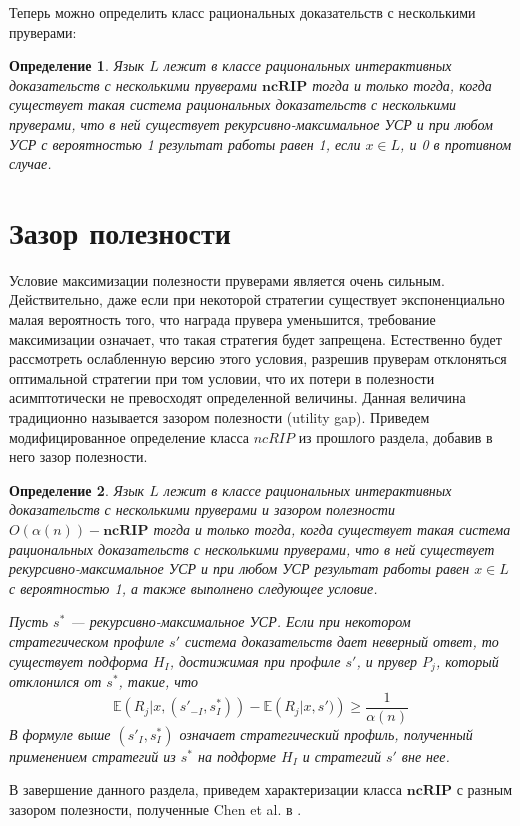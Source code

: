 \documentclass[14pt, a4paper]{extreport}
\newtheorem{definition}{\indent Определение}
\begin{document}
        Теперь можно определить класс рациональных доказательств с несколькими пруверами:

        \begin{definition}
            Язык $L$ лежит в классе рациональных интерактивных доказательств с несколькими пруверами $\textbf{ncRIP}$ тогда и только тогда, когда существует такая система рациональных доказательств с несколькими пруверами, что в ней существует рекурсивно-максимальное УСР и при любом УСР с вероятностью 1 результат работы равен 1, если $x \in L$, и 0 в противном случае.
        \end{definition}

        \section{Зазор полезности}
        Условие максимизации полезности пруверами является очень сильным. Действительно, даже если при некоторой стратегии существует экспоненциально малая вероятность того, что награда прувера уменьшится, требование максимизации означает, что такая стратегия будет запрещена. Естественно будет рассмотреть ослабленную версию этого условия, разрешив пруверам отклоняться оптимальной стратегии при том условии, что их потери в полезности асимптотически не превосходят определенной величины. Данная величина традиционно называется зазором полезности (utility gap). Приведем модифицированное определение класса $ncRIP$ из прошлого раздела, добавив в него зазор полезности.

\begin{definition}
    Язык $L$ лежит в классе рациональных интерактивных доказательств с несколькими пруверами и зазором полезности $O(\alpha(n))-\textbf{ncRIP}$ тогда и только тогда, когда существует такая система рациональных доказательств с несколькими пруверами, что в ней существует рекурсивно-максимальное УСР и при любом УСР результат работы равен $x \in L$ с вероятностью 1, а также выполнено следующее условие.

    Пусть $s^*$ --- рекурсивно-максимальное УСР. Если при некотором стратегическом профиле $s'$ система доказательств дает неверный ответ, то существует подформа $H_I$, достижимая при профиле $s'$, и прувер $P_j$, который отклонился от $s^*$, такие, что
    \[\mathbb{E}\left(R_j|x, (s'_{-I}, s^*_I)\right) - \mathbb{E}\left(R_j|x, s')\right) \geqslant \frac{1}{\alpha(n)}\]
    В формуле выше $(s'_I, s^*_I)$ означает стратегический профиль, полученный применением стратегий из $s^*$ на подформе $H_I$ и стратегий $s'$ вне нее.
\end{definition}
        В завершение данного раздела, приведем характеризации класса $\textbf{ncRIP}$ с разным зазором полезности, полученные Chen et al. в \cite{chen2017noncoop}.
\end{document}
